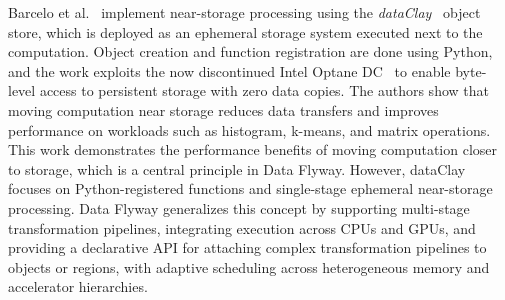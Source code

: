 Barcelo et al.~\cite{barcelo2022revisiting} implement near-storage processing using the \emph{dataClay}~\cite{marti2017dataclay} object store, which is deployed as an ephemeral storage system executed next to the computation. Object creation and function registration are done using Python, and the work exploits the now discontinued Intel Optane DC~\cite{inteloptane} to enable byte-level access to persistent storage with zero data copies. The authors show that moving computation near storage reduces data transfers and improves performance on workloads such as histogram, k-means, and matrix operations. This work demonstrates the performance benefits of moving computation closer to storage, which is a central principle in Data Flyway. However, dataClay focuses on Python-registered functions and single-stage ephemeral near-storage processing. Data Flyway generalizes this concept by supporting multi-stage transformation pipelines, integrating execution across CPUs and GPUs, and providing a declarative API for attaching complex transformation pipelines to objects or regions, with adaptive scheduling across heterogeneous memory and accelerator hierarchies.

